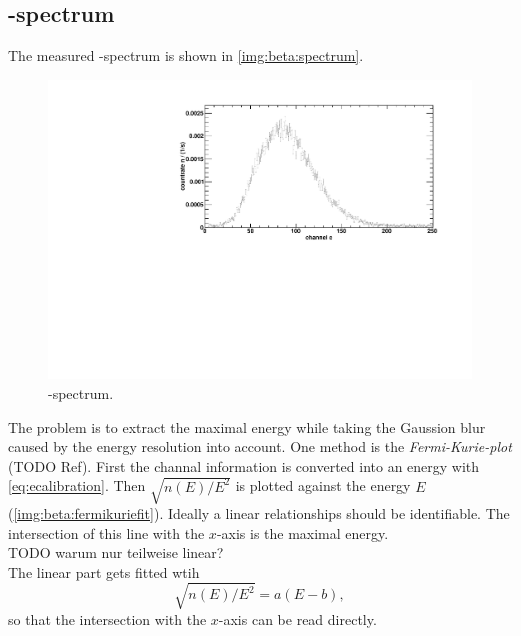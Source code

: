 \subsection{\textbeta-spectrum}
The measured \textbeta-spectrum is shown in \autoref{img:beta:spectrum}.
\begin{figure}[H]
\begin{center}
  \includegraphics[width=\textwidth]{../img/betaspectrum.pdf}
  \caption{\textbeta-spectrum.}
  \label{img:beta:spectrum}
\end{center}
\end{figure}
The problem is to extract the maximal energy while taking the Gaussion blur caused by the energy resolution into account. One method is the 
\emph{Fermi-Kurie-plot} (TODO Ref).  %
First the channal information is converted into an energy with \autoref{eq:ecalibration}. Then $\sqrt{n(E)/E^2}$ is plotted against 
the energy $E$ (\autoref{img:beta:fermikuriefit}). Ideally a linear relationships should be identifiable. The intersection of this line with 
the $x$-axis is the maximal energy. \\
TODO warum nur teilweise linear? \\ %
The linear part gets fitted wtih
\begin{equation}
    \sqrt{n(E)/E^2} = a(E-b),
\end{equation}
so that the intersection with the $x$-axis can be read directly.
